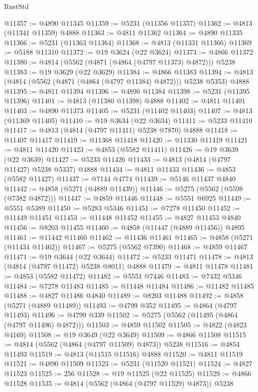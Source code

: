 \begin{lexlean}{RustStd}
\begin{coremodule}
@11357 := @4890 @11345
@11359 := @5231 (@11356 @11357)
@11362 := @4813 (@11341 @11359) @4888
@11363 := @4811 @11362
@11364 := @4890 @11335
@11366 := @5231 (@11363 @11364)
@11368 := @4813 (@11331 @11366)
@11369 := @5188 @11310
@11372 := @19 @3624 (@22 @3624)
@11373 := @4866 @11372
@11380 := @4814 (@5562 (@4871 (@4864 (@4797 @11373) @4872))) @5238
@11383 := @19 @3629 (@22 @3629)
@11384 := @4866 @11383
@11394 := @4813 (@4814 (@5562 (@4871 (@4864 (@4797 @11384) @4872))) @5238 @5353) @4888
@11395 := @4811 @11394
@11396 := @4890 @11384
@11398 := @5231 (@11395 @11396)
@11401 := @4813 (@11380 @11398) @4888
@11402 := @4811 @11401
@11403 := @4890 @11373
@11405 := @5231 (@11402 @11403)
@11407 := @4813 (@11369 @11405)
@11410 := @19 @3634 (@22 @3634)
@11411 := @5233 @11410
@11417 := @4813 (@4814 (@4797 @11411) @5238 @7870) @4888
@11418 := @11407 @11417
@11419 := @11368 @11418
@11420 := @11330 @11419
@11421 := @4811 @11420
@11423 := @4853 (@5582 @11411)
@11426 := @19 @3639 (@22 @3639)
@11427 := @5233 @11426
@11433 := @4813 (@4814 (@4797 @11427) @5238 @5337) @4888
@11434 := @4811 @11433
@11436 := @4853 (@5582 @11427)
@11437 := @7144 @4774
@11439 := @5146 @11437 @4840
@11442 := @4858 (@5271 (@4889 @11439))
@11446 := @5275 (@5562 (@5598 (@7382 @4872)))
@11447 := @4859 @11446
@11448 := @5551 @6925
@11449 := @5551 @5389
@11450 := @5283 @5346
@11451 := @7278 @11450
@11452 := @11449 @11451
@11453 := @11448 @11452
@11455 := @4827 @11453 @4840
@11456 := @8203 @11455
@11460 := @4858 (@11447 (@4889 @11456)) @4895
@11461 := @11442 @11460
@11462 := @11436 @11461
@11465 := @4858 (@5271 (@11434 @11462))
@11467 := @5275 (@5562 @7390)
@11468 := @4859 @11467
@11471 := @19 @3644 (@22 @3644)
@11472 := @5233 @11471
@11478 := @4813 (@4814 (@4797 @11472) @5238 @8011) @4888
@11479 := @4811 @11478
@11481 := @4853 (@5582 @11472)
@11482 := @5551 @7446
@11483 := @7432 @5346
@11484 := @7278 @11483
@11485 := @11448 @11484
@11486 := @11482 @11485
@11488 := @4827 @11486 @4840
@11489 := @8203 @11488
@11492 := @4858 (@5271 (@4889 @11489))
@11493 := @4799 @352
@11495 := @4864 (@4797 @11493)
@11496 := @4799 @339
@11502 := @5275 (@5562 (@11495 (@4864 (@4797 @11496) @4872)))
@11503 := @4859 @11502
@11505 := @4822 (@4823 @4169)
@11508 := @19 @3649 (@22 @3649)
@11509 := @4866 @11508
@11515 := @4814 (@5562 (@4864 (@4797 @11509) @4873)) @5238
@11516 := @4854 @11493
@11519 := @4813 (@11515 @11516) @4888
@11520 := @4811 @11519
@11521 := @4890 @11509
@11523 := @5231 (@11520 @11521)
@11524 := @4827 @11523
@11525 := 256
@11528 := @19 @11525 (@22 @11525)
@11529 := @4866 @11528
@11535 := @4814 (@5562 (@4864 (@4797 @11529) @4873)) @5238

\end{coremodule}
\end{lexlean}
